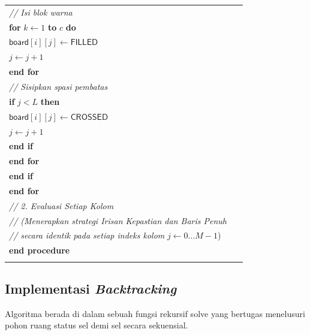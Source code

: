 \documentclass[conference]{IEEEtran}
\begin{document}
\begin{table}[H]
\begin{tabular}{|p{0.95\linewidth}|}
\quad \quad \quad \quad \textit{// Isi blok warna} \\
\quad \quad \quad \quad \textbf{for} $k \leftarrow 1$ \textbf{to} $c$ \textbf{do} \\
\quad \quad \quad \quad \quad $\textsf{board}[i][j] \leftarrow \textsf{FILLED}$ \\
\quad \quad \quad \quad \quad $j \leftarrow j + 1$ \\
\quad \quad \quad \quad \textbf{end for} \\
\quad \quad \quad \quad \textit{// Sisipkan spasi pembatas} \\
\quad \quad \quad \quad \textbf{if} $j < L$ \textbf{then} \\
\quad \quad \quad \quad \quad $\textsf{board}[i][j] \leftarrow \textsf{CROSSED}$ \\
\quad \quad \quad \quad \quad $j \leftarrow j + 1$ \\
\quad \quad \quad \quad \textbf{end if} \\
\quad \quad \quad \textbf{end for} \\
\quad \quad \textbf{end if} \\
\quad \textbf{end for} \\
\quad \textit{// 2. Evaluasi Setiap Kolom} \\
\quad \textit{// (Menerapkan strategi Irisan Kepastian dan Baris Penuh} \\
\quad \textit{// secara identik pada setiap indeks kolom } $j \leftarrow 0 \dots M-1$) \\
\textbf{end procedure} \\
\vspace{-0.5em} \\
\hline
\end{tabular}
\label{tab:pseudo_preprocess}
\end{table}

\subsection{Implementasi \textit{Backtracking}}
Algoritma berada di dalam sebuah fungsi rekursif \textsf{solve} yang bertugas menelusuri pohon ruang status sel demi sel secara sekuensial. 
\end{document}

